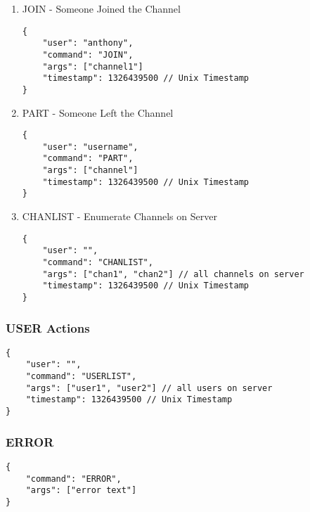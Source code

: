 \documentclass[11pt]{article}
\begin{document}
\begin{enumerate}
\item JOIN - Someone Joined the Channel
\label{sec-2-2-2-1}

\lstset{language=js,label= ,caption= ,numbers=none}
\begin{lstlisting}
{
    "user": "anthony",
    "command": "JOIN",
    "args": ["channel1"]
    "timestamp": 1326439500 // Unix Timestamp
}
\end{lstlisting}

\item PART - Someone Left the Channel
\label{sec-2-2-2-2}

\lstset{language=js,label= ,caption= ,numbers=none}
\begin{lstlisting}
{
    "user": "username",
    "command": "PART",
    "args": ["channel"]
    "timestamp": 1326439500 // Unix Timestamp
}
\end{lstlisting}
\item CHANLIST - Enumerate Channels on Server
\label{sec-2-2-2-3}
\lstset{language=js,label= ,caption= ,numbers=none}
\begin{lstlisting}
{
    "user": "",
    "command": "CHANLIST",
    "args": ["chan1", "chan2"] // all channels on server
    "timestamp": 1326439500 // Unix Timestamp
}
\end{lstlisting}
\end{enumerate}

\subsubsection{USER Actions}
\label{sec-2-2-3}

\lstset{language=js,label= ,caption= ,numbers=none}
\begin{lstlisting}
{
    "user": "",
    "command": "USERLIST",
    "args": ["user1", "user2"] // all users on server
    "timestamp": 1326439500 // Unix Timestamp
}
\end{lstlisting}

\subsubsection{ERROR}
\label{sec-2-2-4}
\lstset{language=js,label= ,caption= ,numbers=none}
\begin{lstlisting}
{
    "command": "ERROR",
    "args": ["error text"]
}
\end{lstlisting}
\end{document}
